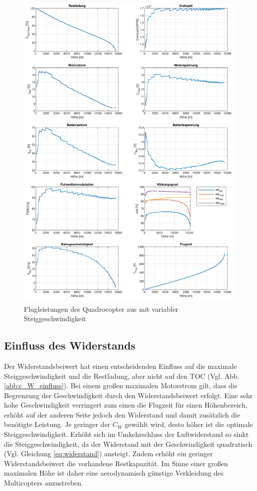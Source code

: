 \begin{figure}[H]
\centering
	\includegraphics[scale=0.7]{Diagramme/Russland_vvar.pdf}
	\caption{Flugleistungen des Quadrocopter aus \cite{Anderson.2018} mit variabler Steiggeschwindigkeit}
	\label{abb:fp}
\end{figure}


\subsection{Einfluss des Widerstands}
\label{subsec:widerstandseinfluss}
Der Widerstandsbeiwert hat einen entscheidenden Einfluss auf die maximale Steiggeschwindigkeit und die Restladung, aber nicht auf den TOC (Vgl. Abb. \ref{abb:c_W_einfluss}). Bei einem großen maximalen Motorstrom gilt, dass die Begrenzung der Geschwindigkeit durch den Widerstandsbeiwert erfolgt. Eine sehr hohe Geschwindigkeit verringert zum einen die Flugzeit für einen Höhenbereich, erhöht auf der anderen Seite jedoch den Widerstand und damit zusätzlich die benötigte Leistung. Je geringer der \ensuremath{C_W} gewählt wird, desto höher ist die optimale Steiggeschwindigkeit. Erhöht sich im Umkehrschluss der Luftwiderstand so sinkt die Steiggeschwindigkeit, da der Widerstand mit der Geschwindigkeit quadratisch (Vgl. Gleichung \ref{eq:widerstand}) ansteigt. Zudem erhöht ein geringer Widerstandsbeiwert die vorhandene Restkapazität. Im Sinne einer großen maximalen Höhe ist daher eine aerodynamisch günstige Verkleidung des Multicopters anzustreben.
  
